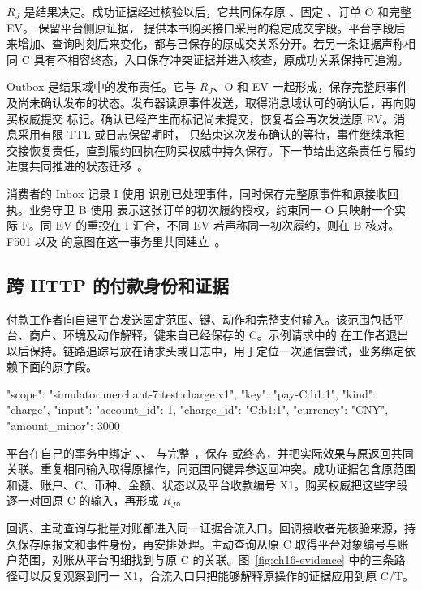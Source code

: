 $R_J$ 是结果决定。成功证据经过核验以后，它共同保存原 、固定 、订单 O 和完整 EV。 保留平台侧原证据， 提供本书购买接口采用的稳定成交字段。平台字段后来增加、查询时刻后来变化，都与已保存的原成交关系分开。若另一条证据声称相同 C 具有不相容终态，入口保存冲突证据并进入核查，原成功关系保持可追溯。

Outbox 是结果域中的发布责任。它与 $R_J$、O 和 EV 一起形成，保存完整原事件及尚未确认发布的状态。发布器读原事件发送，取得消息域认可的确认后，再向购买权威提交  标记。确认已经产生而标记尚未提交，恢复者会再次发送原 EV。消息采用有限 TTL 或日志保留期时， 只结束这次发布确认的等待，事件继续承担交接恢复责任，直到履约回执在购买权威中持久保存。下一节给出这条责任与履约进度共同推进的状态迁移~\cite{outbox}。

消费者的 Inbox 记录 I 使用  识别已处理事件，同时保存完整原事件和原接收回执。业务守卫 B 使用  表示这张订单的初次履约授权，约束同一 O 只映射一个实际 F。同 EV 的重投在 I 汇合，不同 EV 若声称同一初次履约，则在 B 核对。F501 以及  的意图在这一事务里共同建立~\cite{idempotent-consumer}。

\subsection{跨 HTTP 的付款身份和证据}

付款工作者向自建平台发送固定范围、键、动作和完整支付输入。该范围包括平台、商户、环境及动作解释，键来自已经保存的 C。示例请求中的  在工作者退出以后保持。链路追踪号放在请求头或日志中，用于定位一次通信尝试，业务绑定依赖下面的原字段。

\begin{BookCode}
{
  "scope": "simulator:merchant-7:test:charge.v1",
  "key": "pay-C:b1:1",
  "kind": "charge",
  "input": {
    "account_id": 1,
    "charge_id": "C:b1:1",
    "currency": "CNY",
    "amount_minor": 3000
  }
}
\end{BookCode}

平台在自己的事务中绑定 、、 与完整 ，保存  或终态，并把实际效果与原返回共同关联。重复相同输入取得原操作，同范围同键异参返回冲突。成功证据包含原范围和键、账户、C、币种、金额、状态以及平台收款编号 X1。购买权威把这些字段逐一对回原 C 的输入，再形成 $R_J$。

回调、主动查询与批量对账都进入同一证据合流入口。回调接收者先核验来源，持久保存原报文和事件身份，再安排处理。主动查询从原 C 取得平台对象编号与账户范围，对账从平台明细找到与原 C 的关联。图~\ref{fig:ch16-evidence} 中的三条路径可以反复观察到同一 X1，合流入口只把能够解释原操作的证据应用到原 C/T。

